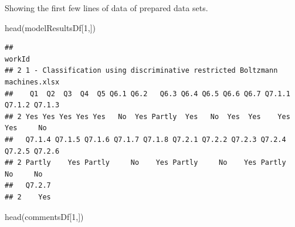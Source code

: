 \documentclass[
]{article}
\newenvironment{Shaded}{\begin{snugshade}}{\end{snugshade}}
\newcommand{\DecValTok}[1]{\textcolor[rgb]{0.00,0.00,0.81}{#1}}
\newcommand{\FunctionTok}[1]{\textcolor[rgb]{0.00,0.00,0.00}{#1}}
\newcommand{\NormalTok}[1]{#1}
\begin{document}
Showing the first few lines of data of prepared data sets.

\begin{Shaded}
\begin{Highlighting}[]
\FunctionTok{head}\NormalTok{(modelResultsDf[}\DecValTok{1}\NormalTok{,])}
\end{Highlighting}
\end{Shaded}

\begin{verbatim}
##                                                                       workId
## 2 1 - Classification using discriminative restricted Boltzmann machines.xlsx
##    Q1  Q2  Q3  Q4  Q5 Q6.1 Q6.2   Q6.3 Q6.4 Q6.5 Q6.6 Q6.7 Q7.1.1 Q7.1.2 Q7.1.3
## 2 Yes Yes Yes Yes Yes   No  Yes Partly  Yes   No  Yes  Yes    Yes    Yes     No
##   Q7.1.4 Q7.1.5 Q7.1.6 Q7.1.7 Q7.1.8 Q7.2.1 Q7.2.2 Q7.2.3 Q7.2.4 Q7.2.5 Q7.2.6
## 2 Partly    Yes Partly     No    Yes Partly     No    Yes Partly     No     No
##   Q7.2.7
## 2    Yes
\end{verbatim}

\begin{Shaded}
\begin{Highlighting}[]
\FunctionTok{head}\NormalTok{(commentsDf[}\DecValTok{1}\NormalTok{,])}
\end{Highlighting}
\end{Shaded}
\end{document}
